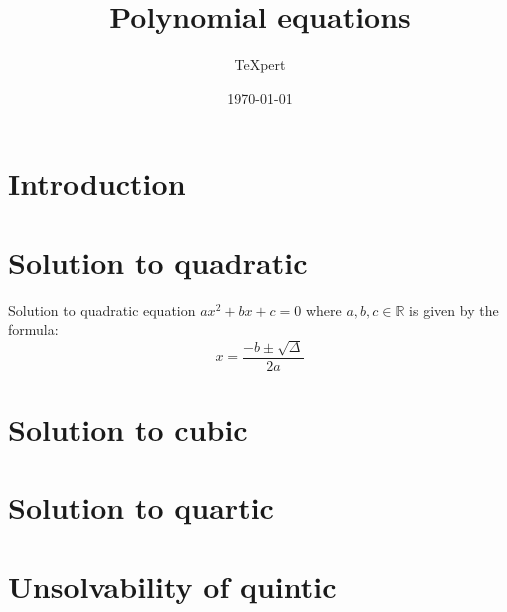 \documentclass{article}
\title{Polynomial equations}
\author{TeXpert}
\date{\today}
\begin{document}
\section{Introduction}

\section{Solution to quadratic}

Solution to quadratic equation $ax^2 + bx + c = 0$ where $a, b, c \in \mathbb{R}$ is given by the formula:
$$x = \frac{-b\pm\sqrt{\Delta}}{2a}$$

\section{Solution to cubic}

\section{Solution to quartic}

\section{Unsolvability of quintic}
\end{document}
